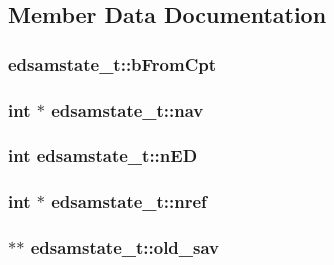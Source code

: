 \subsection{\-Member \-Data \-Documentation}
\hypertarget{structedsamstate__t_a851c95aa8fb1595ae17004883e7deb7e}{
\subsubsection[{b\-From\-Cpt}]{ {\bf edsamstate\-\_\-t\-::b\-From\-Cpt}}}\label{structedsamstate__t_a851c95aa8fb1595ae17004883e7deb7e}
\hypertarget{structedsamstate__t_a4220b0869f4b26b29899c9e77cd294ce}{
\subsubsection[{nav}]{\setlength{\rightskip}{0pt plus 5cm}int $\ast$ {\bf edsamstate\-\_\-t\-::nav}}}\label{structedsamstate__t_a4220b0869f4b26b29899c9e77cd294ce}
\hypertarget{structedsamstate__t_a36c0b164ac3aadb210e5566ca51b5220}{
\subsubsection[{n\-E\-D}]{\setlength{\rightskip}{0pt plus 5cm}int {\bf edsamstate\-\_\-t\-::n\-E\-D}}}\label{structedsamstate__t_a36c0b164ac3aadb210e5566ca51b5220}
\hypertarget{structedsamstate__t_ac2a17e3d74e1ee51f5ffdaf56ffc210d}{
\subsubsection[{nref}]{\setlength{\rightskip}{0pt plus 5cm}int $\ast$ {\bf edsamstate\-\_\-t\-::nref}}}\label{structedsamstate__t_ac2a17e3d74e1ee51f5ffdaf56ffc210d}
\hypertarget{structedsamstate__t_a9b3403c81ec51536f3376eca33b850df}{
\subsubsection[{old\-\_\-sav}]{ $\ast$$\ast$ {\bf edsamstate\-\_\-t\-::old\-\_\-sav}}}\label{structedsamstate__t_a9b3403c81ec51536f3376eca33b850df}
